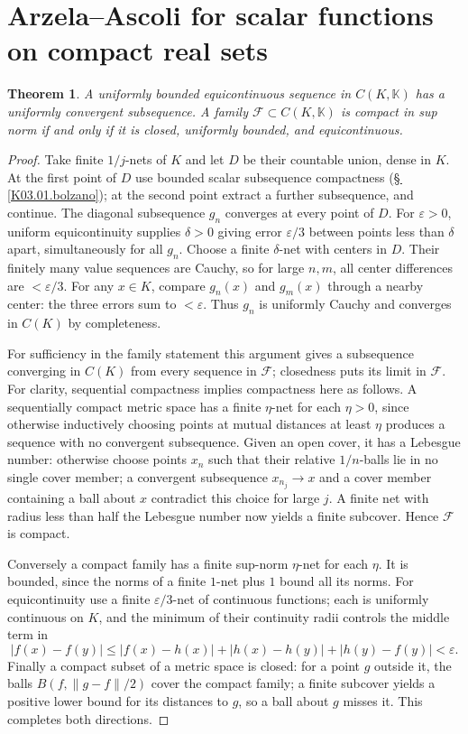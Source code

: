 \documentclass[11pt,oneside,a4paper]{book}
\newtheorem{theorem}{Theorem}[chapter]
\theoremstyle{definition}
\theoremstyle{remark}
\newcommand{\K}{\mathbb K}
\newcommand{\eps}{\varepsilon}
\newcommand{\abs}[1]{\lvert#1\rvert}
\newcommand{\norm}[1]{\lVert#1\rVert}
\newcommand{\KEntry}[2]{\Needspace{7\baselineskip}\section{#2}\label{#1}{\small\sffamily\color{black!60}\detokenize{#1}}\par}
\newcommand{\KRef}[1]{\hyperref[#1]{\S\,\ref*{#1}}}
\begin{document}
\KEntry{K03.16.ascoli}{Arzela--Ascoli for scalar functions on compact real sets}
\begin{theorem}
A uniformly bounded equicontinuous sequence in $C(K,\K)$ has a uniformly convergent subsequence. A family $\mathcal F\subset C(K,\K)$ is compact in sup norm if and only if it is closed, uniformly bounded, and equicontinuous.
\end{theorem}
\begin{proof}
Take finite $1/j$-nets of $K$ and let $D$ be their countable union, dense in $K$. At the first point of $D$ use bounded scalar subsequence compactness (\KRef{K03.01.bolzano}); at the second point extract a further subsequence, and continue. The diagonal subsequence $g_n$ converges at every point of $D$. For $\eps>0$, uniform equicontinuity supplies $\delta>0$ giving error $\eps/3$ between points less than $\delta$ apart, simultaneously for all $g_n$. Choose a finite $\delta$-net with centers in $D$. Their finitely many value sequences are Cauchy, so for large $n,m$, all center differences are $<\eps/3$. For any $x\in K$, compare $g_n(x)$ and $g_m(x)$ through a nearby center: the three errors sum to $<\eps$. Thus $g_n$ is uniformly Cauchy and converges in $C(K)$ by completeness.

For sufficiency in the family statement this argument gives a subsequence converging in $C(K)$ from every sequence in $\mathcal F$; closedness puts its limit in $\mathcal F$. For clarity, sequential compactness implies compactness here as follows. A sequentially compact metric space has a finite $\eta$-net for each $\eta>0$, since otherwise inductively choosing points at mutual distances at least $\eta$ produces a sequence with no convergent subsequence. Given an open cover, it has a Lebesgue number: otherwise choose points $x_n$ such that their relative $1/n$-balls lie in no single cover member; a convergent subsequence $x_{n_j}\to x$ and a cover member containing a ball about $x$ contradict this choice for large $j$. A finite net with radius less than half the Lebesgue number now yields a finite subcover. Hence $\mathcal F$ is compact.

Conversely a compact family has a finite sup-norm $\eta$-net for each $\eta$. It is bounded, since the norms of a finite $1$-net plus $1$ bound all its norms. For equicontinuity use a finite $\eps/3$-net of continuous functions; each is uniformly continuous on $K$, and the minimum of their continuity radii controls the middle term in
\[\abs{f(x)-f(y)}\leq\abs{f(x)-h(x)}+\abs{h(x)-h(y)}+\abs{h(y)-f(y)}<\eps.\]
Finally a compact subset of a metric space is closed: for a point $g$ outside it, the balls $B(f,\norm{g-f}/2)$ cover the compact family; a finite subcover yields a positive lower bound for its distances to $g$, so a ball about $g$ misses it. This completes both directions.
\end{proof}
\end{document}
